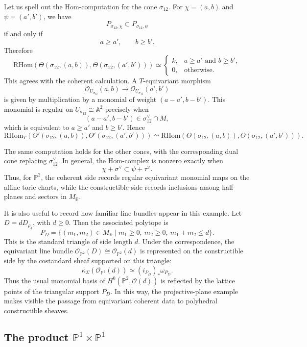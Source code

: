 Let us spell out the Hom-computation for the cone \(\sigma_{12}\). For \(\chi=(a,b)\) and \(\psi=(a',b')\), we have
\[
P_{\sigma_{12},\chi}\subset P_{\sigma_{12},\psi}
\]
if and only if
\[
a\ge a',
\qquad
b\ge b'.
\]
Therefore
\[
\mathrm{RHom}(\Theta(\sigma_{12},(a,b)),\Theta(\sigma_{12},(a',b')))
\simeq
\begin{cases}
k, & a\ge a'\text{ and } b\ge b',\\
0, & \text{otherwise}.
\end{cases}
\]
This agrees with the coherent calculation. A \(T\)-equivariant morphism
\[
\mathcal O_{U_{\sigma_{12}}}(a,b)
\longrightarrow
\mathcal O_{U_{\sigma_{12}}}(a',b')
\]
is given by multiplication by a monomial of weight \((a-a',b-b')\). This monomial is regular on \(U_{\sigma_{12}}\cong\mathbb A^2\) precisely when
\[
(a-a',b-b')\in \sigma_{12}^\vee\cap M,
\]
which is equivalent to \(a\ge a'\) and \(b\ge b'\). Hence
\[
\mathrm{RHom}_T(\Theta'(\sigma_{12},(a,b)),\Theta'(\sigma_{12},(a',b')))
\simeq
\mathrm{RHom}(\Theta(\sigma_{12},(a,b)),\Theta(\sigma_{12},(a',b'))).
\]

The same computation holds for the other cones, with the corresponding dual cone replacing \(\sigma_{12}^\vee\). In general, the Hom-complex is nonzero exactly when
\[
\chi+\sigma^\vee\subset \psi+\tau^\vee.
\]
Thus, for \(\mathbb P^2\), the coherent side records regular equivariant monomial maps on the affine toric charts, while the constructible side records inclusions among half-planes and sectors in \(M_{\mathbb R}\).

It is also useful to record how familiar line bundles appear in this example. Let \(D=dD_{\rho_3}\), with \(d\ge 0\). Then the associated polytope is
\[
P_D
=
\{(m_1,m_2)\in M_{\mathbb R}\mid m_1\ge 0,\ m_2\ge 0,\ m_1+m_2\le d\}.
\]
This is the standard triangle of side length \(d\). Under the correspondence, the equivariant line bundle \(\mathcal O_{\mathbb P^2}(D)\cong\mathcal O_{\mathbb P^2}(d)\) is represented on the constructible side by the costandard sheaf supported on this triangle:
\[
\kappa_\Sigma(\mathcal O_{\mathbb P^2}(d))
\simeq
(i_{P_D})_*\omega_{P_D}.
\]
Thus the usual monomial basis of \(H^0(\mathbb P^2,\mathcal O(d))\) is reflected by the lattice points of the triangular support \(P_D\). In this way, the projective-plane example makes visible the passage from equivariant coherent data to polyhedral constructible sheaves.



\subsection{The product \texorpdfstring{$\mathbb P^1\times\mathbb P^1$}{P1 x P1}}

